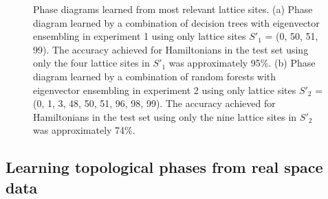 \documentclass[10pt]{revtex4-1}
\begin{document}
\begin{figure}
\centering
{}
\caption{Phase diagrams learned from most relevant lattice sites. (a) Phase diagram learned by a combination of decision trees with eigenvector ensembling in experiment 1 using only lattice sites $S'_1$ = (0, 50, 51, 99). The accuracy achieved for Hamiltonians in the test set using only the four lattice sites in $S'_1$ was approximately 95\%.  (b) Phase diagram learned by a combination of random forests with eigenvector ensembling in experiment 2 using only lattice sites $S'_2$ = (0, 1, 3, 48, 50, 51, 96, 98, 99). The accuracy achieved for Hamiltonians in the test set using only the nine lattice sites in $S'_2$ was approximately 74\%.}
\label{less_feat}
\end{figure}

\subsection*{Learning topological phases from real space data}
\end{document}
